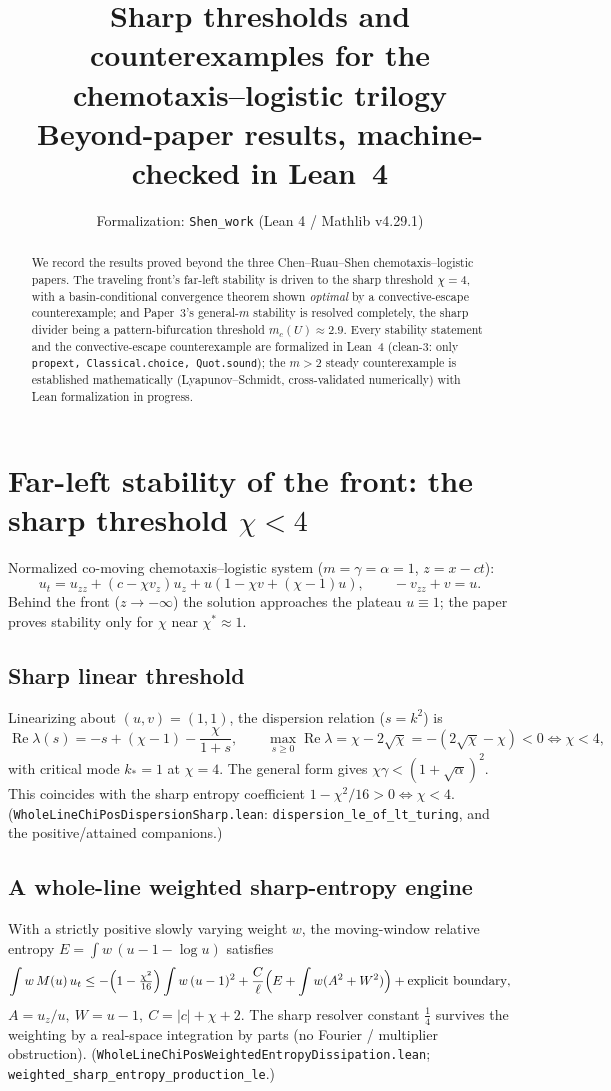 \documentclass[11pt]{article}
\title{Sharp thresholds and counterexamples for the chemotaxis--logistic trilogy\\
\large Beyond-paper results, machine-checked in Lean~4}
\author{Formalization: \texttt{Shen\_work} (Lean 4 / Mathlib v4.29.1)}
\date{}
\begin{document}
\maketitle

\begin{abstract}
We record the results proved beyond the three Chen--Ruau--Shen chemotaxis--logistic papers.
The traveling front's far-left stability is driven to the sharp threshold $\chi=4$, with a
basin-conditional convergence theorem shown \emph{optimal} by a convective-escape
counterexample; and Paper~3's general-$m$ stability is resolved completely, the sharp divider
being a pattern-bifurcation threshold $m_c(U)\approx 2.9$. Every stability statement and the
convective-escape counterexample are formalized in Lean~4 (clean-3: only
\texttt{propext, Classical.choice, Quot.sound}); the $m>2$ steady counterexample is established
mathematically (Lyapunov--Schmidt, cross-validated numerically) with Lean formalization in progress.
\end{abstract}

\section{Far-left stability of the front: the sharp threshold $\chi<4$}

Normalized co-moving chemotaxis--logistic system ($m=\gamma=\alpha=1$, $z=x-ct$):
\[
u_t = u_{zz} + (c-\chi v_z)u_z + u(1-\chi v+(\chi-1)u),\qquad -v_{zz}+v=u .
\]
Behind the front ($z\to-\infty$) the solution approaches the plateau $u\equiv1$; the paper proves
stability only for $\chi$ near $\chi^*\approx1$.

\subsection{Sharp linear threshold}
Linearizing about $(u,v)=(1,1)$, the dispersion relation ($s=k^2$) is
\[
\operatorname{Re}\lambda(s) = -s+(\chi-1)-\frac{\chi}{1+s},\qquad
\max_{s\ge0}\operatorname{Re}\lambda = \chi-2\sqrt\chi = -(2\sqrt\chi-\chi)<0 \iff \chi<4,
\]
with critical mode $k_*=1$ at $\chi=4$. The general form gives $\chi\gamma<(1+\sqrt\alpha)^2$.
This coincides with the sharp entropy coefficient $1-\chi^2/16>0\iff\chi<4$.
(\texttt{WholeLineChiPosDispersionSharp.lean}: \texttt{dispersion\_le\_of\_lt\_turing}, and the
positive/attained companions.)

\subsection{A whole-line weighted sharp-entropy engine}
With a strictly positive slowly varying weight $w$, the moving-window relative entropy
$E=\int w\,(u-1-\log u)$ satisfies
\[
\int w\,M(u)\,u_t \le -\Bigl(1-\tfrac{\chi^2}{16}\Bigr)\int w\,(u-1)^2
 + \frac{C}{\ell}\Bigl(E+\int w(A^2+W^2)\Bigr) + \text{explicit boundary},
\]
$A=u_z/u,\ W=u-1,\ C=|c|+\chi+2$. The sharp resolver constant $\tfrac14$ survives the weighting
by a real-space integration by parts (no Fourier / multiplier obstruction).
(\texttt{WholeLineChiPosWeightedEntropyDissipation.lean};
\texttt{weighted\_sharp\_entropy\_production\_le}.)
\end{document}
